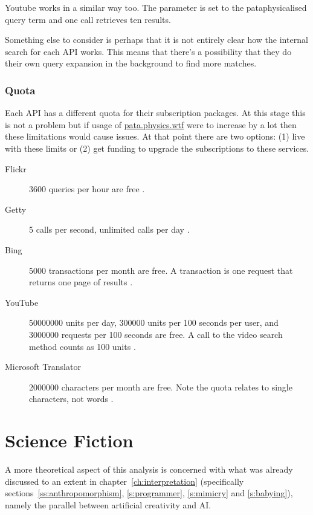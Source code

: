 Youtube works in a similar way too. The  parameter is set to the pataphysicalised query term and one call retrieves ten results.

Something else to consider is perhaps that it is not entirely clear how the internal search for each \ac{API} works. This means that there's a possibility that they do their own query expansion in the background to find more matches.


\subsubsection{Quota}
\label{s:quota}

Each \ac{API} has a different quota for their subscription packages. At this stage this is not a problem but if usage of \url{pata.physics.wtf} were to increase by a lot then these limitations would cause issues. At that point there are two options: (1) live with these limits or (2) get funding to upgrade the subscriptions to these services.

\begin{description}
  \item[Flickr] \num{3600} queries per hour are free \autocite{FlickrGuideAPI}.
  \item[Getty] \num{5} calls per second, unlimited calls per day \autocite{GettyOverviewAPI}.
  \item[Bing] \num{5000} transactions per month are free. A transaction is one request that returns one page of results \autocite{BingAzureAPI}.
  \item[YouTube] \num{50000000} units per day, \num{300000} units per \num{100} seconds per user, and \num{3000000} requests per \num{100} seconds are free. A call to the video search method counts as \num{100} units \autocite{YouTubeAPI}.
  \item[Microsoft Translator] \num{2000000} characters per month are free. Note the quota relates to single characters, not words \autocite{TranslatorAPI}.
\end{description}


\section{Science Fiction}

A more theoretical aspect of this analysis is concerned with what was already discussed to an extent in chapter~\ref{ch:interpretation} (specifically sections~\ref{ss:anthropomorphism}, \ref{s:programmer}, \ref{s:mimicry} and \ref{s:babying}), namely the parallel between artificial creativity and \acl{AI}. 


